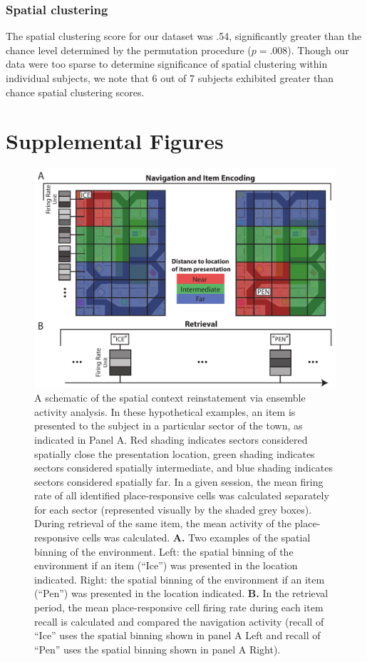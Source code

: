 \subsubsection*{Spatial clustering}
The spatial clustering score for our dataset was .54, significantly greater than the chance level determined by the permutation procedure ($p = .008$).  Though our data were too sparse to determine significance of spatial clustering within individual subjects, we note that 6 out of 7 subjects exhibited greater than chance spatial clustering scores.

\clearpage
\section{Supplemental Figures}

 \begin{figure}[ht]
\centering
  \includegraphics[width=.95\textwidth]{./tex/dboy/figs/methods}
  \caption[Spatial context reinstatement analysis method]{A schematic of the spatial context reinstatement via ensemble activity analysis. In these hypothetical examples, an item is presented to the subject in a particular sector of the town, as indicated in Panel A.  Red shading indicates sectors considered spatially close the presentation location, green shading indicates sectors considered spatially intermediate, and blue shading indicates sectors considered spatially far. In a given session, the mean firing rate of all identified place-responsive cells was calculated separately for each sector (represented visually by the shaded grey boxes).  During retrieval of the same item, the mean activity of the place-responsive cells was calculated.  \textbf{A.} Two examples of the spatial binning of the environment. Left: the spatial binning of the environment if an item (``Ice'') was presented in the location indicated. Right: the spatial binning of the environment if an item (``Pen'') was presented in the location indicated.  \textbf{B.} In the retrieval period, the mean place-responsive cell firing rate during each item recall is calculated and compared the navigation activity (recall of ``Ice'' uses the spatial binning shown in panel A Left and recall of ``Pen'' uses the spatial binning shown in panel A Right).}
\label{fig:methods}
\end{figure}

